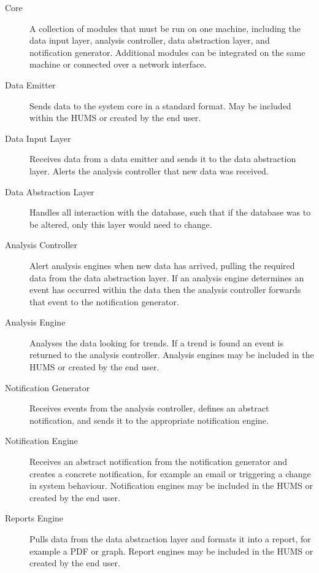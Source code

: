 \documentclass[10pt,a4paper]{article}
\begin{document}
\begin{description}
  \item[Core] A collection of modules that must be run on one machine, including the data input layer, analysis controller, data abstraction layer, and notification generator. Additional modules can be integrated on the same machine or connected over a network interface.

  \item[Data Emitter] Sends data to the system core in a standard
    format. May be included within the HUMS or created by the end
    user.

  \item[Data Input Layer] Receives data from a data emitter and sends
    it to the data abstraction layer. Alerts the analysis controller
    that new data was received.

  \item[Data Abstraction Layer] Handles all interaction with the
    database, such that if the database was to be altered, only this
    layer would need to change.

  \item[Analysis Controller] Alert analysis engines when new data
    has arrived, pulling the required data from the data abstraction
    layer. If an analysis engine determines an event has occurred
    within the data then the analysis controller forwards that event
    to the notification generator.

  \item[Analysis Engine] Analyses the data looking for trends. If a
    trend is found an event is returned to the analysis
    controller. Analysis engines may be included in the HUMS or
    created by the end user.

  \item[Notification Generator] Receives events from the analysis
    controller, defines an abstract notification, and sends it to the
    appropriate notification engine.

  \item[Notification Engine] Receives an abstract notification from
    the notification generator and creates a concrete notification,
    for example an email or triggering a change in system
    behaviour. Notification engines may be included in the HUMS or
    created by the end user.

  \item[Reports Engine] Pulls data from the data abstraction layer and
    formats it into a report, for example a PDF or graph. Report
    engines may be included in the HUMS or created by the end user.
\end{description}
\end{document}
